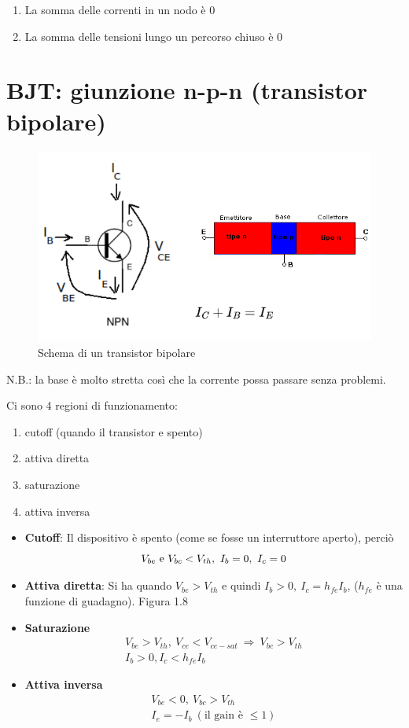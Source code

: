 \documentclass[
]{book}
\providecommand{\tightlist}{%
  \setlength{\itemsep}{0pt}\setlength{\parskip}{0pt}}
\begin{document}
\begin{enumerate}
\def\labelenumi{\arabic{enumi}.}
\tightlist
\item
  La somma delle correnti in un nodo è 0
\item
  La somma delle tensioni lungo un percorso chiuso è 0
\end{enumerate}

\section{BJT: giunzione n-p-n (transistor
bipolare)}\label{bjt-giunzione-n-p-n-transistor-bipolare}

\begin{figure}
\centering
\includegraphics[width=0.5\linewidth,height=\textheight,keepaspectratio]{immagini/7.png}
\caption{Schema di un transistor bipolare}
\end{figure}

N.B.: la base è molto stretta così che la corrente possa passare senza
problemi.

Ci sono 4 regioni di funzionamento:

\begin{enumerate}
\def\labelenumi{\arabic{enumi}.}
\tightlist
\item
  cutoff (quando il transistor e spento)
\item
  attiva diretta
\item
  saturazione
\item
  attiva inversa
\end{enumerate}

\begin{itemize}
\item
  \textbf{Cutoff}: Il dispositivo è spento (come se fosse un
  interruttore aperto), perciò
  \[V_{be}\ {\rm e}\ V_{bc}<V_{th},\ I_{b}=0,\ I_{c}=0\]
\item
  \textbf{Attiva diretta}: Si ha quando \(V_{be}>V_{th}\) e quindi
  \(I_{b}>0,\ I_{c}=h_{fe}I_{b}\), (\(h_{fe}\) è una funzione di
  guadagno). Figura 1.8
\item
  \textbf{Saturazione} \begin{gather*}
  V_{be}>V_{th},\ V_{ce}<V_{ce-sat}\ \Longrightarrow\ V_{bc}>V_{th} \\
  I_{b}>0,I_{c}<h_{fe}I_{b}
  \end{gather*}
\item
  \textbf{Attiva inversa} \begin{gather*}
  V_{be}<0,\ V_{bc}>V_{th} \\
  I_{e} =-I_{b}\ (\text{il gain è }\leq 1)
  \end{gather*}
\end{itemize}
\end{document}
